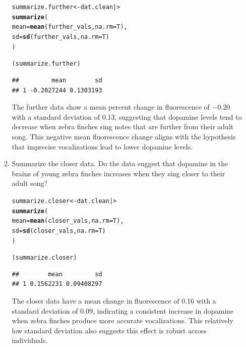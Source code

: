 \documentclass{article}\usepackage[]{graphicx}\usepackage[]{xcolor}
\makeatletter
\newcommand{\hldef}[1]{\textcolor[rgb]{0.345,0.345,0.345}{#1}}%
\newcommand{\hlkwb}[1]{\textcolor[rgb]{0.69,0.353,0.396}{#1}}%
\newcommand{\hlkwc}[1]{\textcolor[rgb]{0.333,0.667,0.333}{#1}}%
\newcommand{\hlkwd}[1]{\textcolor[rgb]{0.737,0.353,0.396}{\textbf{#1}}}%
\newenvironment{kframe}{%
 \def\at@end@of@kframe{}%
 \ifinner\ifhmode%
  \def\at@end@of@kframe{\end{minipage}}%
  \begin{minipage}{\columnwidth}%
 \fi\fi%
 \def\FrameCommand##1{\hskip\@totalleftmargin \hskip-\fboxsep
 \colorbox{shadecolor}{##1}\hskip-\fboxsep
     \hskip-\linewidth \hskip-\@totalleftmargin \hskip\columnwidth}%
 \MakeFramed {\advance\hsize-\width
   \@totalleftmargin\z@ \linewidth\hsize
   \@setminipage}}%
 {\par\unskip\endMakeFramed%
 \at@end@of@kframe}
\newenvironment{knitrout}{}{} %
\makeatother
\begin{document}
\begin{enumerate}
\begin{enumerate}
\begin{knitrout}\scriptsize
{}\color{fgcolor}\begin{kframe}
\begin{alltt}
 \hldef{summarize.further} \hlkwb{<-} \hldef{dat.clean |>}
   \hlkwd{summarize}\hldef{(}
     \hlkwc{mean} \hldef{=} \hlkwd{mean}\hldef{(further_vals,} \hlkwc{na.rm}\hldef{=T),}
     \hlkwc{sd} \hldef{=} \hlkwd{sd}\hldef{(further_vals,} \hlkwc{na.rm}\hldef{=T)}
   \hldef{)}

 \hldef{(summarize.further)}
\end{alltt}
\begin{verbatim}
##         mean        sd
## 1 -0.2027244 0.1303193
\end{verbatim}
\end{kframe}
\end{knitrout}

  The further data show a mean percent change in fluorescence of $-0.20$ with a
  standard deviation of 0.13, suggesting that dopamine levels tend to decrease 
  when zebra finches sing notes that are further from their adult song. This
  negative mean fluorescence change aligns with the hypothesis that imprecise
  vocalizations lead to lower dopamine levels.
  
   \item Summarize the closer data. Do the data suggest that
   dopamine in the brains of young zebra finches increases when
   they sing closer to their adult song?
   
\begin{knitrout}\scriptsize
{}\color{fgcolor}\begin{kframe}
\begin{alltt}
\hldef{summarize.closer} \hlkwb{<-} \hldef{dat.clean |>}
  \hlkwd{summarize}\hldef{(}
    \hlkwc{mean} \hldef{=} \hlkwd{mean}\hldef{(closer_vals,} \hlkwc{na.rm}\hldef{=T),}
    \hlkwc{sd} \hldef{=} \hlkwd{sd}\hldef{(closer_vals,} \hlkwc{na.rm}\hldef{=T)}
  \hldef{)}

\hldef{(summarize.closer)}
\end{alltt}
\begin{verbatim}
##        mean         sd
## 1 0.1562231 0.09408297
\end{verbatim}
\end{kframe}
\end{knitrout}

The closer data have a mean change in fluorescence of 0.16 with a standard
deviation of 0.09, indicating a consistent increase in dopamine when zebra finches
produce more accurate vocalizations. This relatively low standard deviation also
suggests this effect is robust across individuals.
   

\end{enumerate}
\end{enumerate}
\end{document}
